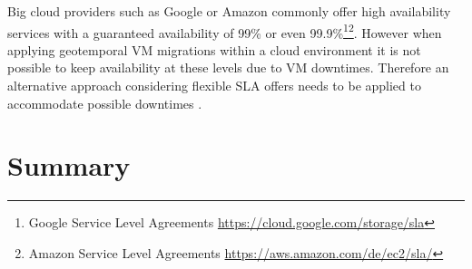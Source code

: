 Big cloud providers such as Google or Amazon commonly offer high availability services with a guaranteed availability of 99\% or even 99.9\%\footnote{Google Service Level Agreements \url{https://cloud.google.com/storage/sla}}\footnote{Amazon Service Level Agreements \url{https://aws.amazon.com/de/ec2/sla/}}. However when applying geotemporal VM migrations within a cloud environment it is not possible to keep availability at these levels due to VM downtimes. Therefore an alternative approach considering flexible SLA offers needs to be applied to accommodate possible downtimes \cite{luvcanin2014energy}. 







%
%
%
%




\section{Summary}



